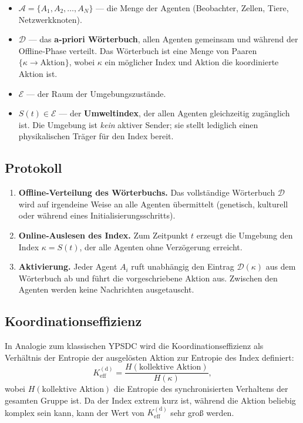 \documentclass[12pt,a4paper]{article}
\begin{document}
	\begin{itemize}[leftmargin=*]
		\item \(\mathcal{A} = \{A_1, A_2, \dots, A_N\}\) — die Menge der Agenten (Beobachter, Zellen, Tiere, Netzwerkknoten).
		\item \(\mathcal{D}\) — das \textbf{a‑priori Wörterbuch}, allen Agenten gemeinsam und während der Offline‑Phase verteilt. Das Wörterbuch ist eine Menge von Paaren \(\{ \kappa \to \text{Aktion} \}\), wobei \(\kappa\) ein möglicher Index und \(\text{Aktion}\) die koordinierte Aktion ist.
		\item \(\mathcal{E}\) — der Raum der Umgebungszustände.
		\item \(S(t) \in \mathcal{E}\) — der \textbf{Umweltindex}, der allen Agenten gleichzeitig zugänglich ist. Die Umgebung ist \emph{kein} aktiver Sender; sie stellt lediglich einen physikalischen Träger für den Index bereit.
	\end{itemize}
	
	\subsection{Protokoll}
	
	\begin{enumerate}[leftmargin=*, label=\textbf{Phase \arabic*:}]
		\item \textbf{Offline‑Verteilung des Wörterbuchs.} Das vollständige Wörterbuch \(\mathcal{D}\) wird auf irgendeine Weise an alle Agenten übermittelt (genetisch, kulturell oder während eines Initialisierungsschritts).
		\item \textbf{Online‑Auslesen des Index.} Zum Zeitpunkt \(t\) erzeugt die Umgebung den Index \(\kappa = S(t)\), der alle Agenten ohne Verzögerung erreicht.
		\item \textbf{Aktivierung.} Jeder Agent \(A_i\) ruft unabhängig den Eintrag \(\mathcal{D}(\kappa)\) aus dem Wörterbuch ab und führt die vorgeschriebene Aktion aus. Zwischen den Agenten werden keine Nachrichten ausgetauscht.
	\end{enumerate}
	
	\subsection{Koordinationseffizienz}
	
	In Analogie zum klassischen YPSDC wird die Koordinationseffizienz als Verhältnis der Entropie der ausgelösten Aktion zur Entropie des Index definiert:
	\begin{equation}
		K_{\mathrm{eff}}^{\mathrm{(d)}} = \frac{H(\text{kollektive Aktion})}{H(\kappa)},
		\label{eq:Keff_d}
	\end{equation}
	wobei \(H(\text{kollektive Aktion})\) die Entropie des synchronisierten Verhaltens der gesamten Gruppe ist. Da der Index extrem kurz ist, während die Aktion beliebig komplex sein kann, kann der Wert von \(K_{\mathrm{eff}}^{\mathrm{(d)}}\) sehr groß werden.
	
\end{document}
